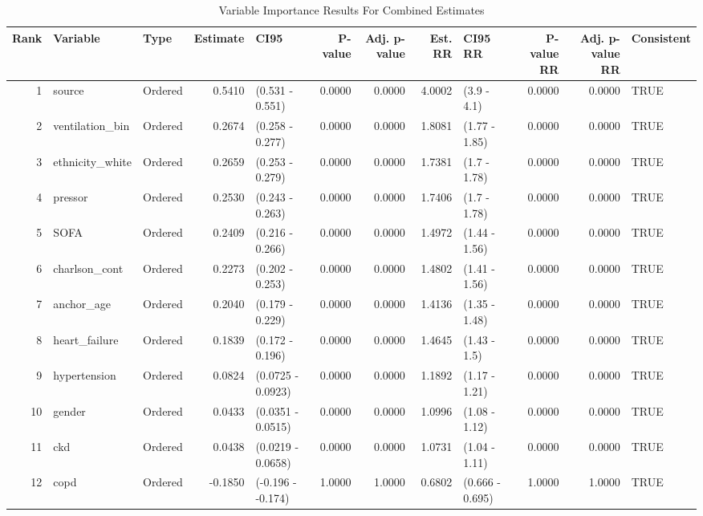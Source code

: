 \begin{table}[ht]
\centering
\caption{Variable Importance Results For Combined Estimates} 
\label{allRes}
\begin{tabular}{rllrlrrrlrrl}
  \hline
Rank & Variable & Type & Estimate & CI95 & P-value & Adj. p-value & Est. RR & CI95 RR & P-value RR & Adj. p-value RR & Consistent \\ 
  \hline
    1 & source & Ordered & 0.5410 & (0.531 - 0.551) & 0.0000 & 0.0000 & 4.0002 & (3.9 - 4.1) & 0.0000 & 0.0000 & TRUE \\ 
      2 & ventilation\_bin & Ordered & 0.2674 & (0.258 - 0.277) & 0.0000 & 0.0000 & 1.8081 & (1.77 - 1.85) & 0.0000 & 0.0000 & TRUE \\ 
      3 & ethnicity\_white & Ordered & 0.2659 & (0.253 - 0.279) & 0.0000 & 0.0000 & 1.7381 & (1.7 - 1.78) & 0.0000 & 0.0000 & TRUE \\ 
      4 & pressor & Ordered & 0.2530 & (0.243 - 0.263) & 0.0000 & 0.0000 & 1.7406 & (1.7 - 1.78) & 0.0000 & 0.0000 & TRUE \\ 
      5 & SOFA & Ordered & 0.2409 & (0.216 - 0.266) & 0.0000 & 0.0000 & 1.4972 & (1.44 - 1.56) & 0.0000 & 0.0000 & TRUE \\ 
      6 & charlson\_cont & Ordered & 0.2273 & (0.202 - 0.253) & 0.0000 & 0.0000 & 1.4802 & (1.41 - 1.56) & 0.0000 & 0.0000 & TRUE \\ 
      7 & anchor\_age & Ordered & 0.2040 & (0.179 - 0.229) & 0.0000 & 0.0000 & 1.4136 & (1.35 - 1.48) & 0.0000 & 0.0000 & TRUE \\ 
      8 & heart\_failure & Ordered & 0.1839 & (0.172 - 0.196) & 0.0000 & 0.0000 & 1.4645 & (1.43 - 1.5) & 0.0000 & 0.0000 & TRUE \\ 
      9 & hypertension & Ordered & 0.0824 & (0.0725 - 0.0923) & 0.0000 & 0.0000 & 1.1892 & (1.17 - 1.21) & 0.0000 & 0.0000 & TRUE \\ 
     10 & gender & Ordered & 0.0433 & (0.0351 - 0.0515) & 0.0000 & 0.0000 & 1.0996 & (1.08 - 1.12) & 0.0000 & 0.0000 & TRUE \\ 
     11 & ckd & Ordered & 0.0438 & (0.0219 - 0.0658) & 0.0000 & 0.0000 & 1.0731 & (1.04 - 1.11) & 0.0000 & 0.0000 & TRUE \\ 
   \hline
   12 & copd & Ordered & -0.1850 & (-0.196 - -0.174) & 1.0000 & 1.0000 & 0.6802 & (0.666 - 0.695) & 1.0000 & 1.0000 & TRUE \\ 
   \hline
\end{tabular}
\end{table}

